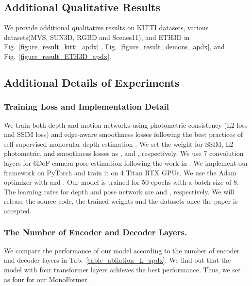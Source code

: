 \documentclass[letterpaper]{article} \usepackage{aaai23}  \usepackage{times}  \usepackage{helvet}  \usepackage{courier}  \usepackage[hyphens]{url}  \usepackage{graphicx} \urlstyle{rm} \def\UrlFont{\rm}  \usepackage{natbib}  \usepackage{caption} \frenchspacing  \setlength{\pdfpagewidth}{8.5in} \setlength{\pdfpageheight}{11in} \usepackage{algorithm}
\newcommand{\tabref}[1]{Tab.~\ref{#1}}
\newcommand{\figref}[1]{Fig.~\ref{#1}}
\begin{document}
\subsection{Additional Qualitative Results}
We provide additional qualitative results on KITTI datasets, various datasets(MVS, SUN3D, RGBD and Scenes11), and ETH3D in \figref{figure_result_kitti_apdx}
, \figref{figure_result_demons_apdx}, and \figref{figure_result_ETH3D_apdx}.


\subsection{Additional Details of Experiments}

\subsubsection{Training Loss and Implementation Detail}
We train both depth and motion networks using photometric consistency (L2 loss and SSIM loss) and edge-aware smoothness losses following the best practices of self-supervised monocular depth estimation \cite{zhou2017unsupervised,godard2019digging,guizilini20203d}.
We set the weight for SSIM, L2 photometric, and smoothness losses as ,  and , respectively. 
We use 7 convolution layers for 6DoF camera pose estimation following the work in \cite{zhou2017unsupervised}.
We implement our framework on PyTorch and train it on 4 Titan RTX GPUs. We use the Adam optimizer \cite{kingma2014adam} with  and . Our model is trained for 50 epochs with a batch size of 8. The learning rates for depth and pose network are  and , respectively. 
We will release the source code, the trained weights and the datasets once the paper is accepted.

\subsubsection{The Number of Encoder and Decoder Layers.}
We compare the performance of our model according to the number of encoder and decoder layers in \tabref{table_abliation_L_apdx}. 
We find out that the model with four transformer layers achieves the best performance.
Thus, we set  as four for our MonoFormer.

\begin{table}[h]
    \centering
    \caption{\textbf{Ablation study on the number of encoder and decoder layers.}}
    \label{table_abliation_L_apdx}
\end{table}
\end{document}
